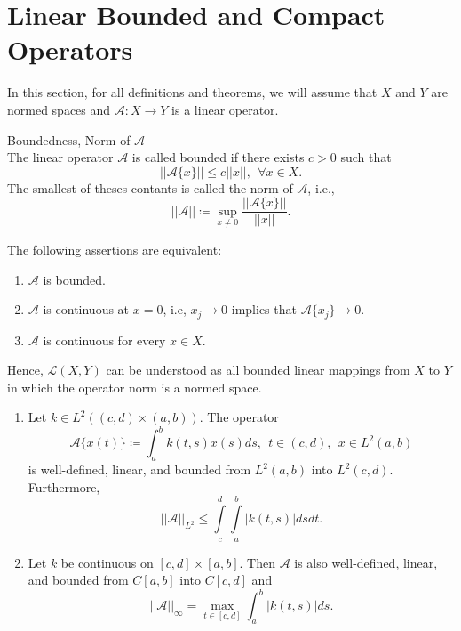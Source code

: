 		\section{Linear Bounded and Compact Operators}

			In this section, for all definitions and theorems, we will assume that $X$ and $Y$ are normed spaces and $\mathcal{A}:X\rightarrow Y$ is a linear operator.
			\begin{definition}\label{def:app:functional:6}
				Boundedness, Norm of $\mathcal{A}$\\
				The linear operator $\mathcal{A}$ is called bounded if there exists $c>0$ such that $$||\mathcal{A}\{x\}||\le c||x||, ~~\forall x\in X.$$ The smallest of theses contants is called the norm of $\mathcal{A}$, i.e., $$||\mathcal{A}|| \coloneqq \sup\limits_{x\neq0}\frac{||\mathcal{A}\{x\}||}{||x||}.$$
			\end{definition}
		
			\begin{theorem}\label{the:app:functional:5}
				The following assertions are equivalent:
				\begin{enumerate}
					\item $\mathcal{A}$ is bounded.
					\item  $\mathcal{A}$ is continuous at $x=0$, i.e, $x_j\rightarrow0$ implies that $\mathcal{A}\{x_j\}\rightarrow0$.
					\item $\mathcal{A}$ is continuous for every $x\in X$.
				\end{enumerate}
			\end{theorem}
			
			Hence, $\mathcal{L}(X,Y)$ can be understood as all bounded linear mappings from $X$ to $Y$ in which the operator norm is a normed space.
			\begin{theorem}\label{the:app:functional:6}
				\begin{enumerate}
					\item Let $k\in L^2((c,d)\times(a,b))$. The operator
					\begin{equation}
						\mathcal{A}\{x(t)\} \coloneqq \int_a^b k(t,s)x(s) ds,~~ t\in(c,d),~~x\in L^2(a,b) \label{eq:app:functional:4}
					\end{equation}
					\noindent is well-defined, linear, and bounded from $L^2(a,b)$ into $L^2(c,d)$. Furthermore, $$||\mathcal{A}||_{L^2} \le \int\limits_c^d\int\limits_a^b |k(t,s)|dsdt. $$
					\item Let $k$ be continuous on $[c,d]\times[a,b]$. Then $\mathcal{A}$ is also well-defined, linear, and bounded from $C[a,b]$ into $C[c,d]$ and $$||\mathcal{A}||_{\infty} = \max\limits_{t\in[c,d]} \int_a^b|k(t,s)|ds.$$
				\end{enumerate}
			\end{theorem}
		
